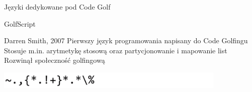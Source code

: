 \begin{frame}{Języki dedykowane pod Code Golf}

    {\large GolfScript}

    \begin{itemize}
        \myitem Darren Smith, 2007
        \myitem Pierwszy język programowania napisany do Code Golfingu
        \myitem Stosuje m.in. arytmetykę stosową oraz partycjonowanie i mapowanie list
        \myitem Rozwinął społeczność golfingową
    \end{itemize}

    \vspace{0.3cm}

    \begin{tcolorbox}[title={Test liczby pierwszej w GolfScript, 14 Bajtów {\color{blue} \hyperlink{frame:przypisy}{(13)}}}]
        {\includegraphics[width=11cm]{figures/primes_golfscript.png}}
    \end{tcolorbox}

\end{frame}
